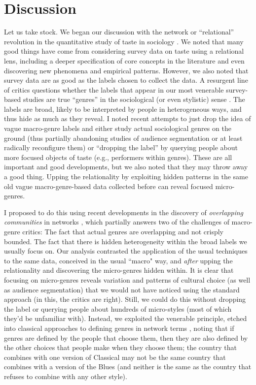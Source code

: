 \documentclass[a4paper,12pt]{extarticle}
\begin{document}
\section{Discussion}
Let us take stock. We began our discussion with the network or ``relational'' revolution in the quantitative study of taste in sociology \citep{pachucki2010cultural}. We noted that many good things have come from considering survey data on taste using a relational lens, including a deeper specification of core concepts in the literature and even discovering new phenomena and empirical patterns. However, we also noted that survey data are as good as the labels chosen to collect the data. A resurgent line of critics questions whether the labels that appear in our most venerable survey-based studies are true ``genres'' in the sociological (or even stylistic) sense \citep{lena2015relational, vlegels2015music}. The labels are broad, likely to be interpreted by people in heterogeneous ways, and thus hide as much as they reveal. I noted recent attempts to just drop the idea of vague macro-genre labels and either study actual sociological genres on the ground (thus partially abandoning studies of audience segmentation or at least radically reconfigure them) or ``dropping the label'' \citep{sonnett2016ambivalence} by querying people about more focused objects of taste (e.g., performers within genres). These are all important and good developments, but we also noted that they may throw away a good thing. Upping the relationality by exploiting hidden patterns in the same old vague macro-genre-based data collected before can reveal focused micro-genres. 

I proposed to do this using recent developments in the discovery of \textit{overlapping communities} in networks \citep{ahn_etal10}, which partially answers two of the challenges of macro-genre critics: The fact that actual genres are overlapping and not crisply bounded. The fact that there is hidden heterogeneity within the broad labels we usually focus on. Our analysis contrasted the application of the usual techniques to the same data, conceived in the usual ``macro" way, and \textit{after} upping the relationality and discovering the micro-genres hidden within. It is clear that focusing on micro-genres reveals variation and patterns of cultural choice (as well as audience segmentation) that we would not have noticed using the standard approach (in this, the critics are right). Still, we could do this without dropping the label or querying people about hundreds of micro-styles (most of which they'd be unfamiliar with). Instead, we exploited the venerable principle, etched into classical approaches to defining genres in network terms \citep{dimaggio1987classification}, noting that if genres are defined by the people that choose them, then they are also defined by the other choices that people make when they choose them; the country that combines with one version of Classical may not be the same country that combines with a version of the Blues (and neither is the same as the country that refuses to combine with any other style). 
\end{document}
